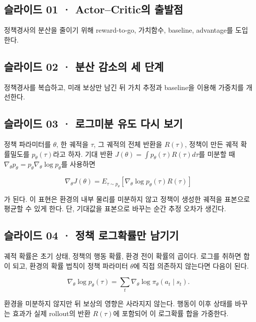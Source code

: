 \documentclass[11pt,a4paper]{article}
\begin{document}
\subsection{슬라이드 01 · Actor–Critic의 출발점}

정책경사의 분산을 줄이기 위해 reward-to-go, 가치함수, baseline, advantage를 도입한다.\par

\subsection{슬라이드 02 · 분산 감소의 세 단계}

정책경사를 복습하고, 미래 보상만 남긴 뒤 가치 추정과 baseline을 이용해 가중치를 개선한다.\par

\subsection{슬라이드 03 · 로그미분 유도 다시 보기}

정책 파라미터를 $\theta$, 한 궤적을 $\tau$, 그 궤적의 전체 반환을 $R(\tau)$, 정책이 만든 궤적 확률밀도를 $p_\theta(\tau)$라고 하자. 기대 반환 $J(\theta)=\int p_\theta(\tau)R(\tau)d\tau$를 미분할 때 $\nabla_\theta p_\theta=p_\theta\nabla_\theta\log p_\theta$를 사용하면\par

\[
\nabla_\theta J(\theta)
=E_{\tau\sim p_\theta}
[\nabla_\theta\log p_\theta(\tau)R(\tau)]
\]

가 된다. 이 표현은 환경의 내부 물리를 미분하지 않고 정책이 생성한 궤적을 표본으로 평균할 수 있게 한다. 단, 기대값을 표본으로 바꾸는 순간 추정 오차가 생긴다.\par

\subsection{슬라이드 04 · 정책 로그확률만 남기기}

궤적 확률은 초기 상태, 정책의 행동 확률, 환경 전이 확률의 곱이다. 로그를 취하면 합이 되고, 환경의 확률 법칙이 정책 파라미터 $\theta$에 직접 의존하지 않는다면 다음이 된다.\par

\[
\nabla_\theta\log p_\theta(\tau)
=\sum_t\nabla_\theta\log\pi_\theta(a_t\mid s_t).
\]

환경을 미분하지 않지만 뒤 보상의 영향은 사라지지 않는다. 행동이 이후 상태를 바꾸는 효과가 실제 rollout의 반환 $R(\tau)$에 포함되어 이 로그확률 합을 가중한다.\par
\end{document}
